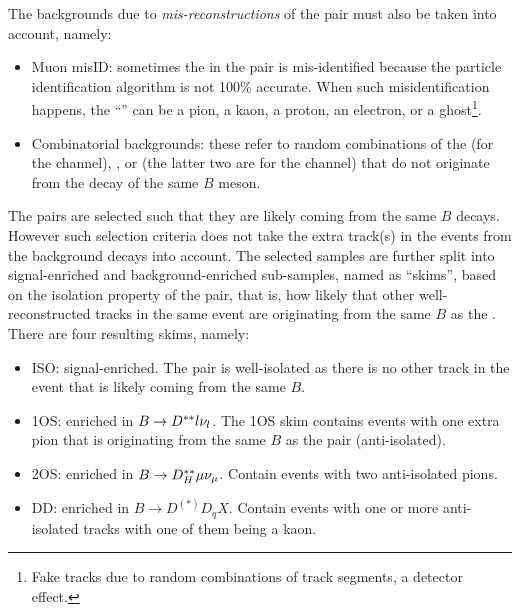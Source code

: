 The backgrounds due to \emph{mis-reconstructions} of the \DXmu pair must
also be taken into account, namely:
\begin{itemize}
    \item Muon misID:
        sometimes the \muon in the \DXmu pair is mis-identified
        because the particle identification algorithm is not 100\% accurate.
        When such misidentification happens,
        the ``\muon'' can be a pion, a kaon, a proton, an electron,
        or a ghost\footnote{
            Fake tracks due to random combinations of track segments, a detector
            effect.
        }.
    \item Combinatorial backgrounds:
        these refer to random combinations of the \Dz \muon
        (for the \Dz channel),
        \Dstar \muon, or \Dz \pion (the latter two are for the \Dstar channel)
        that do not originate from the decay of the same $B$ meson.
\end{itemize}


The \DXmu pairs are selected such that they are likely coming from
the same $B$ decays.
However such selection criteria does not take the extra track(s) in the events
from the background decays into account.
The selected \DXmu samples are further split into signal-enriched and
background-enriched sub-samples, named as ``skims'',
based on the isolation property of the \DXmu pair,
that is, how likely that other well-reconstructed tracks in the same event
are originating from the same $B$ as the \DXmu.
There are four resulting skims, namely:
\begin{itemize}
    \item ISO:
        signal-enriched. The \DXmu pair is well-isolated as there
        is no other track in the event that is likely coming from the same $B$.
    \item 1OS:
        enriched in $B \rightarrow D^{**} l{{\nu}_l}$.
        The 1OS skim contains events with one extra pion that is originating
        from the same $B$ as the \DXmu pair
        (anti-isolated).
    \item 2OS:
        enriched in $B \rightarrow D^{**}_H \mu{\ensuremath{{\nu}_\mu}}$.
        Contain events with two anti-isolated pions.
    \item DD:
        enriched in $B \rightarrow D^{(*)} D_q X$.
        Contain events with one or more anti-isolated tracks with one
        of them being a kaon.
\end{itemize}


